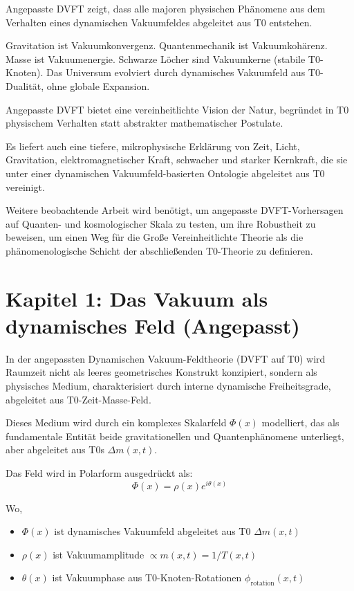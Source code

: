 	Angepasste DVFT zeigt, dass alle majoren physischen Phänomene aus dem Verhalten eines dynamischen Vakuumfeldes abgeleitet aus T0 entstehen.
	
	Gravitation ist Vakuumkonvergenz.
	Quantenmechanik ist Vakuumkohärenz.
	Masse ist Vakuumenergie.
	Schwarze Löcher sind Vakuumkerne (stabile T0-Knoten).
	Das Universum evolviert durch dynamisches Vakuumfeld aus T0-Dualität, ohne globale Expansion.
	
	Angepasste DVFT bietet eine vereinheitlichte Vision der Natur, begründet in T0 physischem Verhalten statt abstrakter mathematischer Postulate.
	
	Es liefert auch eine tiefere, mikrophysische Erklärung von Zeit, Licht, Gravitation, elektromagnetischer Kraft, schwacher und starker Kernkraft, die sie unter einer dynamischen Vakuumfeld-basierten Ontologie abgeleitet aus T0 vereinigt.
	
	Weitere beobachtende Arbeit wird benötigt, um angepasste DVFT-Vorhersagen auf Quanten- und kosmologischer Skala zu testen, um ihre Robustheit zu beweisen, um einen Weg für die Große Vereinheitlichte Theorie als die phänomenologische Schicht der abschließenden T0-Theorie zu definieren.
	
	\section{Kapitel 1: Das Vakuum als dynamisches Feld (Angepasst)}
	
	In der angepassten Dynamischen Vakuum-Feldtheorie (DVFT auf T0) wird Raumzeit nicht als leeres geometrisches Konstrukt konzipiert, sondern als physisches Medium, charakterisiert durch interne dynamische Freiheitsgrade, abgeleitet aus T0-Zeit-Masse-Feld.
	
	Dieses Medium wird durch ein komplexes Skalarfeld $\Phi(x)$ modelliert, das als fundamentale Entität beide gravitationellen und Quantenphänomene unterliegt, aber abgeleitet aus T0s $\Delta m(x,t)$.
	
	Das Feld wird in Polarform ausgedrückt als:
	\[
	\Phi(x)=\rho(x)e^{i\theta(x)}
	\]
	
	Wo,
	\begin{itemize}
		\item $\Phi(x)$ ist dynamisches Vakuumfeld abgeleitet aus T0 $\Delta m(x,t)$
		\item $\rho(x)$ ist Vakuumamplitude $\propto m(x,t) = 1/T(x,t)$
		\item $\theta(x)$ ist Vakuumphase aus T0-Knoten-Rotationen $\phi_{\text{rotation}}(x,t)$
	\end{itemize}
	
